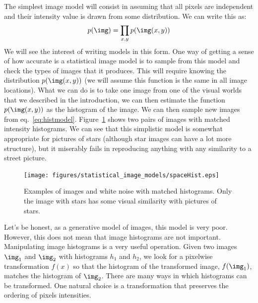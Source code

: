 The simplest image model will consist in assuming that all pixels are independent and their intensity value is drawn from some distribution. We can write this as:
\begin{equation}
  p(\img) = \prod_{x,y} p(\img(x,y))
  \label{eq:histmodel}
\end{equation}
We will see the interest of writing models in this form. One way of getting a sense of how accurate is a statistical image model is to sample from this model and check the types of images that it produces. This will require knowing the distribution $p(\img(x,y))$ (we will assume this function is the same in all image locations). What we can do is to take one image from one of the visual worlds that we described in the introduction, we can then estimate the function $p(\img(x,y))$ as the histogram of the image. We can then sample new images from eq.~\ref{eq:histmodel}.  Figure~\ref{fig:histMatch} shows two pairs of images with matched intensity histograms. We can see that this simplistic model is somewhat appropriate for pictures of stars (although star images can have a lot more structure), but it miserably fails in reproducing anything with any similarity to a street picture.


\begin{figure}[htpb]
  \centerline{
    \texttt{[image: figures/statistical\_image\_models/spaceHist.eps]}
  }
  \caption{Examples of images and white noise with matched histograms. Only the image with stars has some visual similarity with pictures of stars.}
  \label{fig:histMatch}
\end{figure}

Let's be honest, as a generative model of images, this model is very poor. However, this does not mean that image histograms are not important. Manipulating image histograms is a very useful operation.  Given two images $\img_1$ and $\img_2$ with histograms $h_1$ and $h_2$, we look for a pixelwise transformation $f(x)$ so that the histogram of the transformed image, $f(\img_1)$, matches the histogram of $\img_2$. There are many ways in which histograms can be transformed. One natural choice is a transformation that preserves the ordering of pixels intensities.
%
%
%
%
%
%
%

